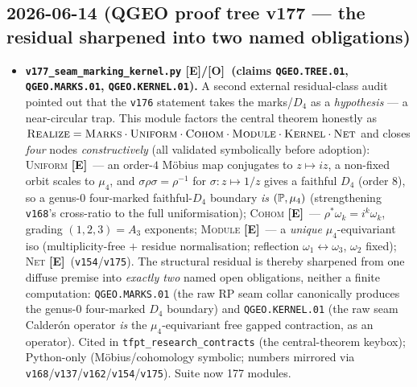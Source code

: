 \documentclass[11pt]{article}
\providecommand{\mE}{\textbf{[E]}}\providecommand{\mC}{\textbf{[C]}}
\providecommand{\mO}{\textbf{[O]}}\providecommand{\mX}{\textbf{[X]}}
\providecommand{\vref}[1]{\texttt{#1}}
\begin{document}
\subsection*{2026-06-14 (QGEO proof tree v177 --- the residual sharpened into two named obligations)}
\begin{itemize}
\item \textbf{\texttt{v177\_seam\_marking\_kernel.py} \mE/\mO\ (claims \texttt{QGEO.TREE.01},
  \texttt{QGEO.MARKS.01}, \texttt{QGEO.KERNEL.01}).} A second external residual-class audit pointed
  out that the \vref{v176} statement takes the marks/$D_4$ as a \emph{hypothesis} --- a near-circular
  trap. This module factors the central theorem honestly as
  $\textsc{Realize}=\textsc{Marks}\cdot\textsc{Uniform}\cdot\textsc{Cohom}\cdot\textsc{Module}\cdot
  \textsc{Kernel}\cdot\textsc{Net}$ and closes \emph{four} nodes \emph{constructively} (all validated
  symbolically before adoption): \textsc{Uniform} \mE\ --- an order-$4$ M\"obius map conjugates to
  $z\mapsto iz$, a non-fixed orbit scales to $\mu_4$, and $\sigma\rho\sigma=\rho^{-1}$ for
  $\sigma:z\mapsto1/z$ gives a faithful $D_4$ (order $8$), so a genus-$0$ four-marked faithful-$D_4$
  boundary \emph{is} $(\mathbb{P},\mu_4)$ (strengthening \vref{v168}'s cross-ratio to the full
  uniformisation); \textsc{Cohom} \mE\ --- $\rho^*\omega_k=i^k\omega_k$, grading $(1,2,3)=A_3$
  exponents; \textsc{Module} \mE\ --- a \emph{unique} $\mu_4$-equivariant iso (multiplicity-free $+$
  residue normalisation; reflection $\omega_1\!\leftrightarrow\!\omega_3$, $\omega_2$ fixed);
  \textsc{Net} \mE\ (\vref{v154}/\vref{v175}). The structural residual is thereby sharpened from one
  diffuse premise into \emph{exactly two} named open obligations, neither a finite computation:
  \texttt{QGEO.MARKS.01} (the raw RP seam collar canonically produces the genus-$0$ four-marked $D_4$
  boundary) and \texttt{QGEO.KERNEL.01} (the raw seam Calder\'on operator \emph{is} the
  $\mu_4$-equivariant free gapped contraction, as an operator). Cited in
  \texttt{tfpt\_research\_contracts} (the central-theorem keybox); Python-only (M\"obius/cohomology
  symbolic; numbers mirrored via \vref{v168}/\vref{v137}/\vref{v162}/\vref{v154}/\vref{v175}). Suite
  now 177 modules.
\end{itemize}
\end{document}
